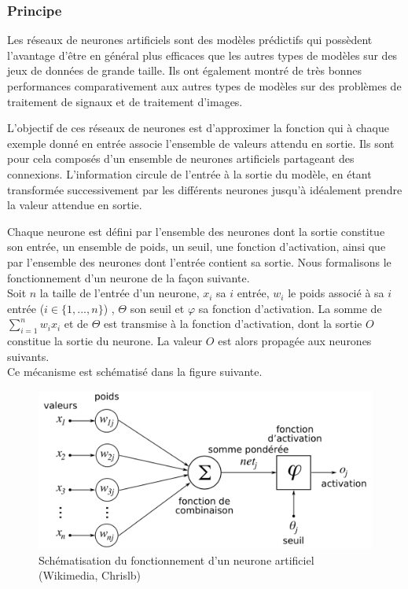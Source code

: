 \subsubsection{Principe}
\par Les réseaux de neurones artificiels sont des modèles prédictifs qui possèdent l'avantage d'être en général plus efficaces que les autres types de modèles sur des jeux de données de grande taille. Ils ont également montré de très bonnes performances comparativement aux autres types de modèles sur des problèmes de traitement de signaux et de traitement d'images.\\

\par L'objectif de ces réseaux de neurones est d'approximer la fonction qui à chaque exemple donné en entrée associe l'ensemble de valeurs attendu en sortie. Ils sont pour cela composés d'un ensemble de neurones artificiels partageant des connexions. L'information circule de l'entrée à la sortie du modèle, en étant transformée successivement par les différents neurones jusqu'à idéalement prendre la valeur attendue en sortie.\\

\par Chaque neurone est défini par l'ensemble des neurones dont la sortie constitue son entrée, un ensemble de poids, un seuil, une fonction d'activation, ainsi que par l'ensemble des neurones dont l'entrée contient sa sortie. Nous formalisons le fonctionnement d'un neurone de la façon suivante.\\
Soit $n$ la taille de l'entrée d'un neurone, $x_i$ sa $i$ entrée, $w_i$ le poids associé à sa $i$ entrée ($i \in \{1, ..., n\}$) , $\Theta$ son seuil et $\varphi$ sa fonction d'activation. La somme de $\sum\limits_{i=1}^n w_ix_i$ et de $\Theta$ est transmise à la fonction d'activation, dont la sortie $O$ constitue la sortie du neurone. La valeur $O$ est alors propagée aux neurones suivants.\\
Ce mécanisme est schématisé dans la figure suivante.

\begin{figure}[!h]
	\centering
	\includegraphics[scale=0.3]{images/neurone.png}
	\caption{Schématisation du fonctionnement d'un neurone artificiel (Wikimedia, Chrislb)}
\end{figure}

